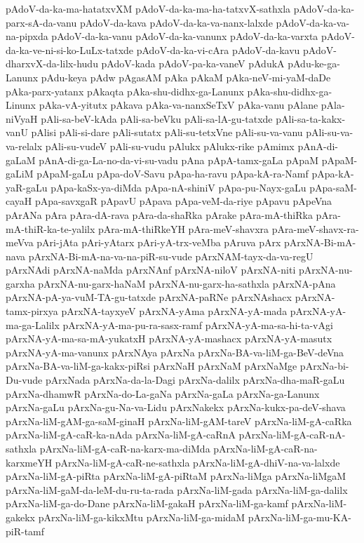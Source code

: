 {pAdoV-da-ka-ma-hatatxvXM
pAdoV-da-ka-ma-ha-tatxvX-sathxla
pAdoV-da-ka-parx-sA-da-vanu
pAdoV-da-kava
pAdoV-da-ka-va-nanx-lalxde
pAdoV-da-ka-va-na-pipxda
pAdoV-da-ka-vanu
pAdoV-da-ka-vanunx
pAdoV-da-ka-varxta
pAdoV-da-ka-ve-ni-si-ko-LuLx-tatxde
pAdoV-da-ka-vi-cAra
pAdoV-da-kavu
pAdoV-dharxvX-da-lilx-hudu
pAdoV-kada
pAdoV-pa-ka-vaneV
pAdukA
pAdu-ke-ga-Lanunx
pAdu-keya
pAdw
pAgasAM
pAka
pAkaM
pAka-neV-mi-yaM-daDe
pAka-parx-yatanx
pAkaqta
pAka-shu-didhx-ga-Lanunx
pAka-shu-didhx-ga-Linunx
pAka-vA-yitutx
pAkava
pAka-va-nanxSeTxV
pAka-vanu
pAlane
pAla-niVyaH
pAli-sa-beV-kAda
pAli-sa-beVku
pAli-sa-lA-gu-tatxde
pAli-sa-ta-kakx-vanU
pAlisi
pAli-si-dare
pAli-sutatx
pAli-su-tetxVne
pAli-su-va-vanu
pAli-su-va-va-relalx
pAli-su-vudeV
pAli-su-vudu
pAlukx
pAlukx-rike
pAmimx
pAnA-di-gaLaM
pAnA-di-ga-La-no-da-vi-su-vadu
pAna
pApA-tamx-gaLa
pApaM
pApaM-gaLiM
pApaM-gaLu
pApa-doV-Savu
pApa-ha-ravu
pApa-kA-ra-Namf
pApa-kA-yaR-gaLu
pApa-kaSx-ya-diMda
pApa-nA-shiniV
pApa-pu-Nayx-gaLu
pApa-saM-cayaH
pApa-savxgaR
pApavU
pApava
pApa-veM-da-riye
pApavu
pApeVna
pArANa
pAra
pAra-dA-rava
pAra-da-shaRka
pArake
pAra-mA-thiRka
pAra-mA-thiR-ka-te-yalilx
pAra-mA-thiRkeYH
pAra-meV-shavxra
pAra-meV-shavx-ra-meVva
pAri-jAta
pAri-yAtarx
pAri-yA-trx-veMba
pAruva
pArx
pArxNA-Bi-mA-nava
pArxNA-Bi-mA-na-va-na-piR-su-vude
pArxNAM-tayx-da-va-regU
pArxNAdi
pArxNA-naMda
pArxNAnf
pArxNA-niloV
pArxNA-niti
pArxNA-nu-garxha
pArxNA-nu-garx-haNaM
pArxNA-nu-garx-ha-sathxla
pArxNA-pAna
pArxNA-pA-ya-vuM-TA-gu-tatxde
pArxNA-paRNe
pArxNAshacx
pArxNA-tamx-pirxya
pArxNA-tayxyeV
pArxNA-yAma
pArxNA-yA-mada
pArxNA-yA-ma-ga-Lalilx
pArxNA-yA-ma-pu-ra-sasx-ramf
pArxNA-yA-ma-sa-hi-ta-vAgi
pArxNA-yA-ma-sa-mA-yukatxH
pArxNA-yA-mashacx
pArxNA-yA-masutx
pArxNA-yA-ma-vanunx
pArxNAya
pArxNa
pArxNa-BA-va-liM-ga-BeV-deVna
pArxNa-BA-va-liM-ga-kakx-piRsi
pArxNaH
pArxNaM
pArxNaMge
pArxNa-bi-Du-vude
pArxNada
pArxNa-da-la-Dagi
pArxNa-dalilx
pArxNa-dha-maR-gaLu
pArxNa-dhamwR
pArxNa-do-La-gaNa
pArxNa-gaLa
pArxNa-ga-Lanunx
pArxNa-gaLu
pArxNa-gu-Na-va-Lidu
pArxNakekx
pArxNa-kukx-pa-deV-shava
pArxNa-liM-gAM-ga-saM-ginaH
pArxNa-liM-gAM-tareV
pArxNa-liM-gA-caRka
pArxNa-liM-gA-caR-ka-nAda
pArxNa-liM-gA-caRnA
pArxNa-liM-gA-caR-nA-sathxla
pArxNa-liM-gA-caR-na-karx-ma-diMda
pArxNa-liM-gA-caR-na-karxmeYH
pArxNa-liM-gA-caR-ne-sathxla
pArxNa-liM-gA-dhiV-na-va-lalxde
pArxNa-liM-gA-piRta
pArxNa-liM-gA-piRtaM
pArxNa-liMga
pArxNa-liMgaM
pArxNa-liM-gaM-da-leM-du-ru-ta-rada
pArxNa-liM-gada
pArxNa-liM-ga-dalilx
pArxNa-liM-ga-do-Dane
pArxNa-liM-gakaH
pArxNa-liM-ga-kamf
pArxNa-liM-gakekx
pArxNa-liM-ga-kikxMtu
pArxNa-liM-ga-midaM
pArxNa-liM-ga-mu-KA-piR-tamf
}
